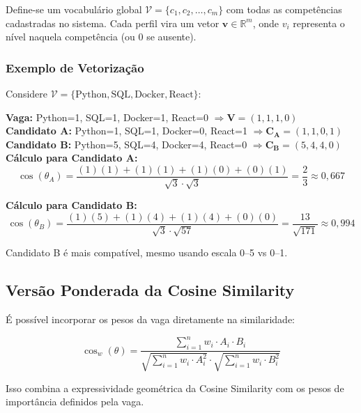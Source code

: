 \documentclass[12pt,a4paper]{article}
\begin{document}
Define-se um vocabulário global $\mathcal{V} = \{c_1, c_2, \ldots, c_m\}$ com todas as
competências cadastradas no sistema. Cada perfil vira um vetor $\mathbf{v} \in \mathbb{R}^m$,
onde $v_i$ representa o nível naquela competência (ou 0 se ausente).

\subsubsection{Exemplo de Vetorização}

Considere $\mathcal{V} = \{\text{Python}, \text{SQL}, \text{Docker}, \text{React}\}$:

\begin{examplebox}
\textbf{Vaga:} Python=1, SQL=1, Docker=1, React=0 $\Rightarrow \mathbf{V} = (1, 1, 1, 0)$\\
\textbf{Candidato A:} Python=1, SQL=1, Docker=0, React=1 $\Rightarrow \mathbf{C_A} = (1, 1, 0, 1)$\\
\textbf{Candidato B:} Python=5, SQL=4, Docker=4, React=0 $\Rightarrow \mathbf{C_B} = (5, 4, 4, 0)$\\[8pt]

\textbf{Cálculo para Candidato A:}
\[
  \cos(\theta_A) = \frac{(1)(1)+(1)(1)+(1)(0)+(0)(1)}{\sqrt{3}\cdot\sqrt{3}} = \frac{2}{3} \approx 0{,}667
\]

\textbf{Cálculo para Candidato B:}
\[
  \cos(\theta_B) = \frac{(1)(5)+(1)(4)+(1)(4)+(0)(0)}{\sqrt{3}\cdot\sqrt{57}} = \frac{13}{\sqrt{171}} \approx 0{,}994
\]

Candidato B é mais compatível, mesmo usando escala 0–5 vs 0–1.
\end{examplebox}

\subsection{Versão Ponderada da Cosine Similarity}

É possível incorporar os pesos da vaga diretamente na similaridade:

\begin{formulabox}
\begin{equation}
  \cos_w(\theta) = \frac{\sum_{i=1}^{n} w_i \cdot A_i \cdot B_i}
  {\sqrt{\sum_{i=1}^{n} w_i \cdot A_i^2} \cdot \sqrt{\sum_{i=1}^{n} w_i \cdot B_i^2}}
  \label{eq:cosine_w}
\end{equation}
\end{formulabox}

Isso combina a expressividade geométrica da Cosine Similarity com os pesos de importância
definidos pela vaga.
\end{document}
